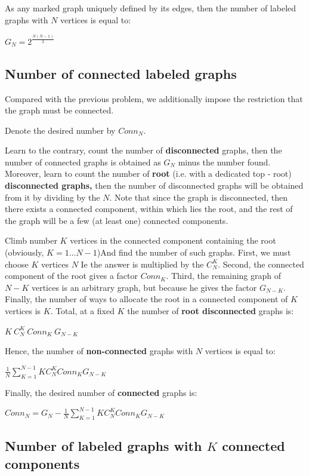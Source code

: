 As any marked graph uniquely defined by its edges, then the number of labeled graphs with $N$ vertices is equal to:

$G_N = 2 ^ {\frac {N (N-1)} {2}}$

\subsection{ Number of connected labeled graphs }

Compared with the previous problem, we additionally impose the restriction that the graph must be connected.

Denote the desired number by $Conn_N$.

Learn to the contrary, count the number of \textbf{disconnected} graphs, then the number of connected graphs is obtained as $G_N$ minus the number found. Moreover, learn to count the number of \textbf{root} (i.e. with a dedicated top - root) \textbf{disconnected graphs,} then the number of disconnected graphs will be obtained from it by dividing by the $N$. Note that since the graph is disconnected, then there exists a connected component, within which lies the root, and the rest of the graph will be a few (at least one) connected components.

Climb number $K$ vertices in the connected component containing the root (obviously, $K = 1 \ldots N-1$)And find the number of such graphs. First, we must choose $K$ vertices $N$ Ie the answer is multiplied by the $C_N ^ K$. Second, the connected component of the root gives a factor $Conn_K$. Third, the remaining graph of $N-K$ vertices is an arbitrary graph, but because he gives the factor $G_ {N-K}$. Finally, the number of ways to allocate the root in a connected component of $K$ vertices is $K$. Total, at a fixed $K$ the number of \textbf{root disconnected} graphs is:

$K\ C_N ^ K\ Conn_K\ G_{N-K}$

Hence, the number of \textbf{non-connected} graphs with $N$ vertices is equal to:

$\frac{1}{N}\sum_{K=1}^{N-1}KC_{N}^{K}Conn_{K}G_{N-K}$

Finally, the desired number of \textbf{connected} graphs is:

$Conn_{N}=G_{N}-\frac{1}{N}\sum_{K=1}^{N-1}KC_{N}^{K}Conn_{K}G_{N-K}$

\subsection{ Number of labeled graphs with $K$ connected components }

